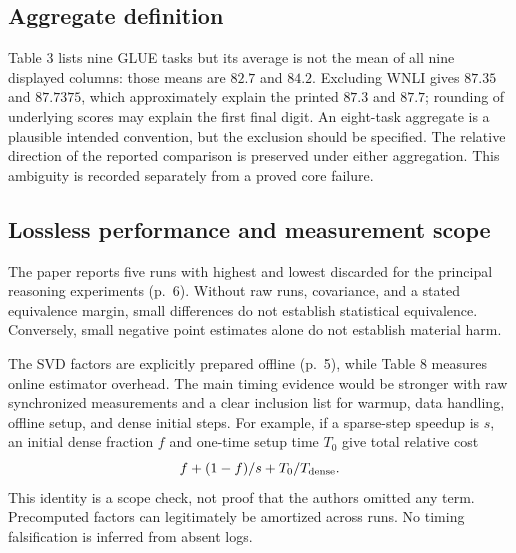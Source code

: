\documentclass[10pt]{article}
\begin{document}
\subsection*{Aggregate definition}
Table 3 lists nine GLUE tasks but its average is not the mean of all nine displayed columns: those means are \(82.7\) and \(84.2\). Excluding WNLI gives \(87.35\) and \(87.7375\), which approximately explain the printed \(87.3\) and \(87.7\); rounding of underlying scores may explain the first final digit. An eight-task aggregate is a plausible intended convention, but the exclusion should be specified. The relative direction of the reported comparison is preserved under either aggregation. This ambiguity is recorded separately from a proved core failure.\par
\subsection*{Lossless performance and measurement scope}
The paper reports five runs with highest and lowest discarded for the principal reasoning experiments (p. 6). Without raw runs, covariance, and a stated equivalence margin, small differences do not establish statistical equivalence. Conversely, small negative point estimates alone do not establish material harm.\par
The SVD factors are explicitly prepared offline (p. 5), while Table 8 measures online estimator overhead. The main timing evidence would be stronger with raw synchronized measurements and a clear inclusion list for warmup, data handling, offline setup, and dense initial steps. For example, if a sparse-step speedup is \(s\), an initial dense fraction \(f\) and one-time setup time \(T_0\) give total relative cost \[f+(1-f)/s+T_0/T_{\rm dense}.\] This identity is a scope check, not proof that the authors omitted any term. Precomputed factors can legitimately be amortized across runs. No timing falsification is inferred from absent logs.\par
\end{document}
